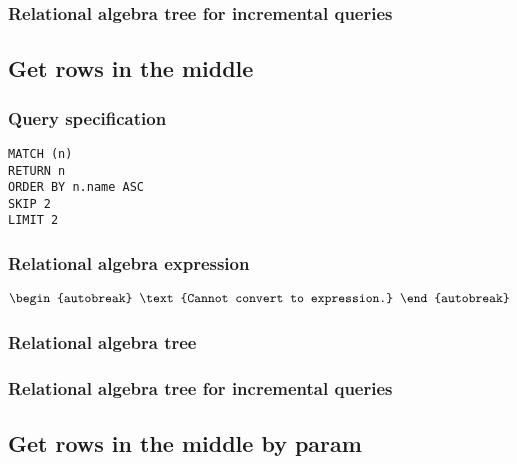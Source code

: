 
\subsubsection*{Relational algebra tree for incremental queries}


\subsection{Get rows in the middle}

\subsubsection*{Query specification}

\begin{lstlisting}
MATCH (n)
RETURN n
ORDER BY n.name ASC
SKIP 2
LIMIT 2
\end{lstlisting}

\subsubsection*{Relational algebra expression}

\begin{align*}
\begin{autobreak}
\text{Cannot convert to expression.}
\end{autobreak}
\end{align*}

\subsubsection*{Relational algebra tree}


\subsubsection*{Relational algebra tree for incremental queries}


\subsection{Get rows in the middle by param}


